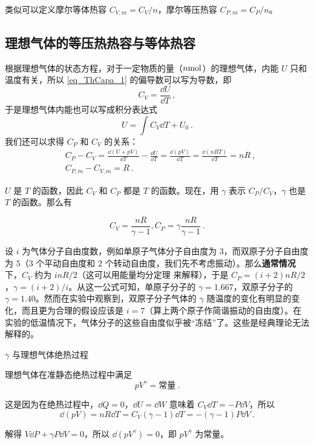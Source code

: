 类似可以定义摩尔等体热容 $C_{V,m}=C_V/n$，摩尔等压热容 $C_{P,m}=C_P/n$。

\subsection{理想气体的等压热热容与等体热容}

根据理想气体的状态方程，对于一定物质的量（$n \rm{mol}$）的理想气体，内能 $U$ 只和温度有关，所以 \autoref{eq_ThCapa_1} 的偏导数可以写为导数，即
\begin{equation}
C_V=\frac{\dd U}{\dd T}~,
\end{equation}
于是理想气体内能也可以写成积分表达式
\begin{equation}
U=\int C_V\dd T + U_0~.
\end{equation}
我们还可以求得 $C_P$ 和 $C_V$ 的关系：
\begin{equation}
\begin{aligned}
&C_P-C_V=\frac{\dd (U+pV)}{\dd T}-\frac{\dd U}{\dd T}=\frac{\dd(pV)}{\dd T}=\frac{\dd (nRT)}{\dd T}=nR~,\\
&C_{P,m}-C_{V,m}=R~.
\end{aligned}
\end{equation}

$U$ 是 $T$ 的函数，因此 $C_V$ 和 $C_P$ 都是 $T$ 的函数。现在，用 $\gamma$ 表示 $C_P/C_V$，$\gamma$ 也是 $T$ 的函数。那么有

\begin{equation}\label{eq_ThCapa_4}
C_V=\frac{nR}{\gamma-1},C_P=\gamma\frac{nR}{\gamma-1}~.
\end{equation}

设 $i$ 为气体分子自由度数，例如单原子气体分子自由度为 $3$，而双原子分子自由度为 $5$（$3$ 个平动自由度和 $2$ 个转动自由度，我们先不考虑振动）。那么\textbf{通常情况}下，$C_V$ 约为 $inR/2$（这可以用能量均分定理 来解释），于是 $C_P=(i+2)nR/2$，$\gamma=(i+2)/i$。从这一公式可知，单原子分子的 $\gamma=1.667$，双原子分子的 $\gamma=1.40$。然而在实验中观察到，双原子分子气体的 $\gamma$ 随温度的变化有明显的变化，而且更为合理的假设应该是 $i=7$（算上两个原子作简谐振动的自由度）。在实验的低温情况下，气体分子的这些自由度似乎被“冻结”了。这些是经典理论无法解释的。
\begin{example}{$\gamma$ 与理想气体绝热过程}

理想气体在准静态绝热过程中满足
\begin{equation}
pV^{\gamma}=\text{常量}~.
\end{equation}

这是因为在绝热过程中，$\dd{Q}=0$，$\dd{U}=\dd{W}$ 意味着 $C_V\dd{T}=-P\dd{V}$，所以
\begin{equation}
\dd(pV)=nR\dd{T}=C_V(\gamma-1)\dd{T}=-(\gamma-1)P\dd{V}~.
\end{equation}

解得 $V\dd{P}+\gamma P\dd{V} = 0$，所以 $\dd{(pV^\gamma)}=0$，即 $pV^{\gamma}$ 为常量。
\end{example}

